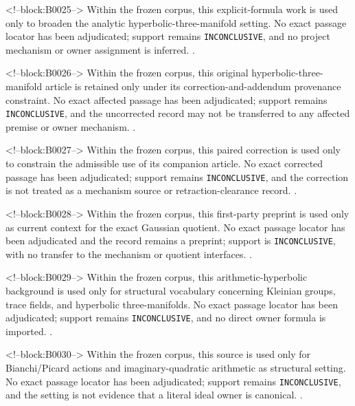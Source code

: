 \documentclass[11pt,a4paper]{article}
\begin{document}
<!--block:B0025-->
Within the frozen corpus, this explicit-formula work is used only to broaden the analytic hyperbolic-three-manifold setting. No exact passage locator has been adjudicated; support remains \texttt{INCONCLUSIVE}, and no project mechanism or owner assignment is inferred.
\citep{P29-S05}.

<!--block:B0026-->
Within the frozen corpus, this original hyperbolic-three-manifold article is retained only under its correction-and-addendum provenance constraint. No exact affected passage has been adjudicated; support remains \texttt{INCONCLUSIVE}, and the uncorrected record may not be transferred to any affected premise or owner mechanism.
\citep{P29-S06}.

<!--block:B0027-->
Within the frozen corpus, this paired correction is used only to constrain the admissible use of its companion article. No exact corrected passage has been adjudicated; support remains \texttt{INCONCLUSIVE}, and the correction is not treated as a mechanism source or retraction-clearance record.
\citep{P29-S07}.

<!--block:B0028-->
Within the frozen corpus, this first-party preprint is used only as current context for the exact Gaussian quotient. No exact passage locator has been adjudicated and the record remains a preprint; support is \texttt{INCONCLUSIVE}, with no transfer to the mechanism or quotient interfaces.
\citep{P29-S09}.

<!--block:B0029-->
Within the frozen corpus, this arithmetic-hyperbolic background is used only for structural vocabulary concerning Kleinian groups, trace fields, and hyperbolic three-manifolds. No exact passage locator has been adjudicated; support remains \texttt{INCONCLUSIVE}, and no direct owner formula is imported.
\citep{P29-S17}.

<!--block:B0030-->
Within the frozen corpus, this source is used only for Bianchi/Picard actions and imaginary-quadratic arithmetic as structural setting. No exact passage locator has been adjudicated; support remains \texttt{INCONCLU\allowbreak{}SIVE}, and the setting is not evidence that a literal ideal owner is canonical.
\citep{P29-S18}.
\end{document}
